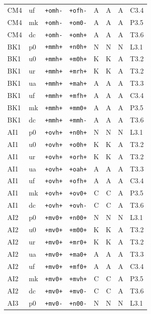 {\begin{longtable}{@{}llllcccl@{}}
CM4 & uf & \texttt{+omh-} & \texttt{+ofh-} & A & A & A & C3.4 \\
CM4 & mk & \texttt{+omh-} & \texttt{+om0-} & A & A & A & P3.5 \\
CM4 & dc & \texttt{+omh-} & \texttt{+omh+} & A & A & A & T3.6 \\
BK1 & p0 & \texttt{+mmh+} & \texttt{+n0h+} & N & N & N & L3.1 \\
BK1 & u0 & \texttt{+mmh+} & \texttt{+m0h+} & K & K & A & T3.2 \\
BK1 & ur & \texttt{+mmh+} & \texttt{+mrh+} & K & K & A & T3.2 \\
BK1 & ua & \texttt{+mmh+} & \texttt{+mah+} & A & A & A & T3.3 \\
BK1 & uf & \texttt{+mmh+} & \texttt{+mfh+} & A & A & A & C3.4 \\
BK1 & mk & \texttt{+mmh+} & \texttt{+mm0+} & A & A & A & P3.5 \\
BK1 & dc & \texttt{+mmh+} & \texttt{+mmh-} & A & A & A & T3.6 \\
AI1 & p0 & \texttt{+ovh+} & \texttt{+n0h+} & N & N & N & L3.1 \\
AI1 & u0 & \texttt{+ovh+} & \texttt{+o0h+} & K & K & A & T3.2 \\
AI1 & ur & \texttt{+ovh+} & \texttt{+orh+} & K & K & A & T3.2 \\
AI1 & ua & \texttt{+ovh+} & \texttt{+oah+} & A & A & A & T3.3 \\
AI1 & uf & \texttt{+ovh+} & \texttt{+ofh+} & A & A & A & C3.4 \\
AI1 & mk & \texttt{+ovh+} & \texttt{+ov0+} & C & C & A & P3.5 \\
AI1 & dc & \texttt{+ovh+} & \texttt{+ovh-} & C & C & A & T3.6 \\
AI2 & p0 & \texttt{+mv0+} & \texttt{+n00+} & N & N & N & L3.1 \\
AI2 & u0 & \texttt{+mv0+} & \texttt{+m00+} & K & K & A & T3.2 \\
AI2 & ur & \texttt{+mv0+} & \texttt{+mr0+} & K & K & A & T3.2 \\
AI2 & ua & \texttt{+mv0+} & \texttt{+ma0+} & A & A & A & T3.3 \\
AI2 & uf & \texttt{+mv0+} & \texttt{+mf0+} & A & A & A & C3.4 \\
AI2 & mk & \texttt{+mv0+} & \texttt{+mvh+} & C & C & A & P3.5 \\
AI2 & dc & \texttt{+mv0+} & \texttt{+mv0-} & C & C & A & T3.6 \\
AI3 & p0 & \texttt{+mv0-} & \texttt{+n00-} & N & N & N & L3.1 \\

\end{longtable}}
